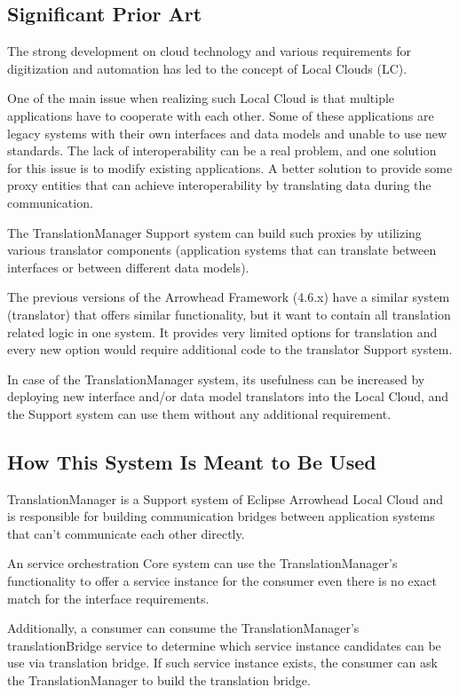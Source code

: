 \documentclass[a4paper]{arrowhead}
\begin{document}
\subsection{Significant Prior Art}
\label{sec:prior_art}

The strong development on cloud technology and various requirements for digitization and automation has led to the concept of Local Clouds (LC).

One of the main issue when realizing such Local Cloud is that multiple applications have to cooperate with each other. Some of these applications are legacy systems with their own interfaces and data models and unable to use new standards. The lack of interoperability can be a real problem, and one solution for this issue is to modify existing applications. A better solution to provide some proxy entities that can achieve interoperability by translating data during the communication.

The TranslationManager Support system can build such proxies by utilizing various translator components (application systems that can translate between interfaces or between different data models).

The previous versions of the Arrowhead Framework (4.6.x) have a similar system (translator) that offers similar functionality, but it want to contain all translation related logic in one system. It provides very limited options for translation and every new option would require additional code to the translator Support system.

In case of the TranslationManager system, its usefulness can be increased by deploying new interface and/or data model translators into the Local Cloud, and the Support system can use them without any additional requirement.

\subsection{How This System Is Meant to Be Used}
\label{sec:use}

TranslationManager is a Support system of Eclipse Arrowhead Local Cloud and is responsible for building communication bridges between application systems that can't communicate each other directly. 

An service orchestration Core system can use the TranslationManager's functionality to offer a service instance for the consumer even there is no exact match for the interface requirements.

Additionally, a consumer can consume the TranslationManager's translationBridge service to determine which service instance candidates can be use via translation bridge. If such service instance exists, the consumer can ask the TranslationManager to build the translation bridge.
\end{document}
